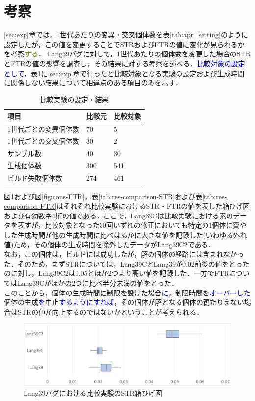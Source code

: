 \documentclass[uplatex,dvipdfmx,a4paper]{jsarticle}
\newcommand{\modified}[1]{{\textcolor{blue}{#1}}}
\newcommand{\modifiedTwo}[1]{{\textcolor{olive}{#1}}}
\begin{document}
\section{考察}\label{sec:cons}
\ref{sec:exp}章では，1世代あたりの変異・交叉個体数を表\ref{tab:apr_setting}のように設定したが，この値を変更することでSTRおよびFTRの値に変化が見られるかを考察\modifiedTwo{する}．
Lang39バグに対して，1世代あたりの個体数を変更した場合のSTRとFTRの値の影響を調査し，その結果に対する考察を述べる．\modified{比較対象の設定として，}表\ref{tab:comparison}に\ref{sec:exp}章で行ったと比較対象となる実験の設定および生成時間に関係しない結果について相違点のある項目のみを示す．
\begin{table}[b]
  \centering
  \caption{比較実験の設定・結果}
  \label{tab:comparison}
  \begin{tabular}{l|ll} \hline\hline
    項目 & 比較元         & 比較対象                           \\\hline
    1世代ごとの変異個体数 & 70 & 5 \\
    1世代ごとの交叉個体数 & 30 & 2 \\
    サンプル数 & 40 & 30 \\
    生成個体数 & 300 & 541 \\
    ビルド失敗個体数 & 274 & 461 \\\hline\hline
  \end{tabular}
\end{table}
図\ref{fig:cons-STR}および図\ref{fig:cons-FTR}，表\ref{tab:res-comparison-STR}および表\ref{tab:res-comparison-FTR}はそれぞれ比較実験におけるSTR・FTRの値を表した箱ひげ図および有効数字4桁の値である．ここで，Lang39Cは比較実験における素のデータを表すが，比較対象となった30回いずれの修正においても特定の1個体に費やした生成時間が他の生成時間に比べはるかに大きな値を記録した(いわゆる外れ値)ため，その個体の生成時間を除外したデータがLang39C2である．\\
なお，この個体は，ビルドには成功したが，解の個体の経路には含まれなかった．そのため，まずSTRについては，Lang39CとLang39が0.02前後の値をとったのに対し，Lang39C2は0.05とほか2つより高い値を記録した．一方でFTRについてはLang39Cがほかの2つに比べ半分未満の値をとった．\\
このことから，個体の生成時間に制限を設けた場合\modified{に}，制限時間を\modified{オーバーした}個体の生成\modified{を}中止\modified{するようにすれば}，その個体が解となる個体の親たりえない場合はSTRの値が向上するのではないかということが考えられる．
\begin{figure}[t]
  \centering
  \includegraphics[width=\linewidth]{fig/cons_STR.png}
  \caption{Lang39バグにおける比較実験のSTR箱ひげ図}
  \label{fig:cons-STR}
\end{figure}
\end{document}
